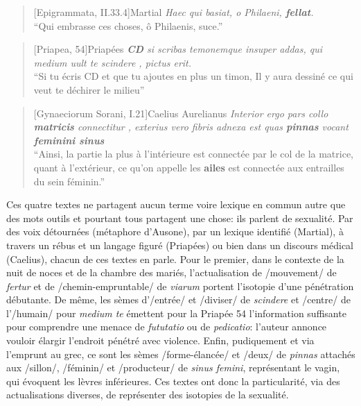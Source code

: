 \begin{quote}[Epigrammata, II.33.4]{Martial}
    \textit{Haec qui basiat, o Philaeni, \textbf{fellat}. \\}
    \enquote{Qui embrasse ces choses, ô Philaenis, suce.}
\end{quote}

\begin{quote}[Priapea, 54]{Priapées}
    \textit{\textbf{CD} si scribas temonemque insuper addas, qui medium uult te scindere , pictus erit.} \\
    \enquote{Si tu écris CD et que tu ajoutes en plus un timon, Il y aura dessiné ce qui veut te déchirer le milieu}
\end{quote}

\begin{quote}[Gynaeciorum Sorani, I.21]{Caelius Aurelianus}
    \textit{Interior ergo pars collo \textbf{matricis} connectitur , exterius vero fibris adnexa est quas \textbf{pinnas} vocant \textbf{feminini sinus}} \\
    \enquote{Ainsi, la partie la plus à l'intérieure est connectée par le col de la matrice, quant à l'extérieur, ce qu'on appelle les \textbf{ailes} est connectée aux entrailles du sein féminin.}
\end{quote}

Ces quatre textes ne partagent aucun terme voire lexique en commun autre que des mots outils et pourtant tous partagent une chose: ils parlent de sexualité. Par des voix détournées (métaphore d'Ausone), par un lexique identifié (Martial), à travers un rébus et un langage figuré (Priapées) ou bien dans un discours médical (Caelius), chacun de ces textes en parle. Pour le premier, dans le contexte de la nuit de noces et de la chambre des mariés, l'actualisation de /mouvement/ de \textit{fertur} et de /chemin-empruntable/ de \textit{viarum} portent l'isotopie d'une pénétration débutante. De même, les sèmes d'/entrée/ et /diviser/ de \textit{scindere} et /centre/ de l'/humain/ pour \textit{medium te} émettent pour la Priapée 54 l'information suffisante pour comprendre une menace de \textit{fututatio} ou de \textit{pedicatio}: l'auteur annonce vouloir élargir l'endroit pénétré avec violence. Enfin, pudiquement et via l'emprunt au grec, ce sont les sèmes /forme-élancée/ et /deux/ de \textit{pinnas} attachés aux /sillon/, /féminin/ et /producteur/ de \textit{sinus femini}, représentant le vagin, qui évoquent les lèvres inférieures. Ces textes ont donc la particularité, via des actualisations diverses, de représenter des isotopies de la sexualité.


